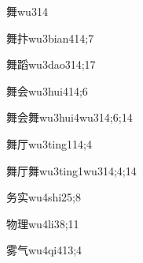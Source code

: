\begin{verbete}{舞}{wu3}{14}
\end{verbete}

\begin{verbete}{舞抃}{wu3bian4}{14;7}
\end{verbete}

\begin{verbete}{舞蹈}{wu3dao3}{14;17}
\end{verbete}

\begin{verbete}{舞会}{wu3hui4}{14;6}
\end{verbete}

\begin{verbete}{舞会舞}{wu3hui4wu3}{14;6;14}
\end{verbete}

\begin{verbete}{舞厅}{wu3ting1}{14;4}
\end{verbete}

\begin{verbete}{舞厅舞}{wu3ting1wu3}{14;4;14}
\end{verbete}

\begin{verbete}{务实}{wu4shi2}{5;8}
\end{verbete}

\begin{verbete}{物理}{wu4li3}{8;11}
\end{verbete}

\begin{verbete}{雾气}{wu4qi4}{13;4}
\end{verbete}

